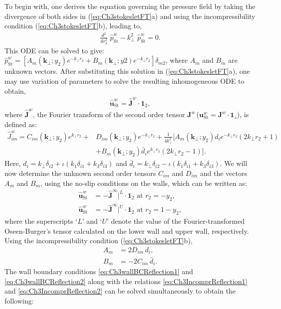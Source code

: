 \documentclass{jfm}
\begin{document}
To begin with, one derives the equation governing the pressure field by taking the divergence of both sides in (\ref{eq:Ch3stokesletFT}a) and using the incompressibility condition (\ref{eq:Ch3stokesletFT}b), leading to,
\begin{align}
	\frac{d^2}{d r_2^2}\,\,\hat{p}^{w}_\text{St}-k_\perp^2\,\, \hat{p}^{w}_\text{St}=0.
\end{align} \label{eq:Ch3PressureFT}
This ODE can be solved to give: $\hat{p}^w_\text{St}=[A_m(\bm{k}_\perp;y_2) e^{-k_\perp r_2}+B_m(\bm{k}_\perp;y2)e^{-k_\perp r_2}]\delta_{m2}$, where $A_m$ and $B_m$ are unknown vectors. After substituting this solution in (\ref{eq:Ch3stokesletFT}a), one may use variation of parameters \citep{arfkenweber} to solve the resulting inhomogeneous ODE to obtain,
\begin{align}
\hat{\bm{u}}^{w}_\text{St}=\hat{\bm{J}}^w\cdot\bm{1}_2,
\end{align}
where $\hat{\bm{J}}^w$, the Fourier transform of the second order tensor $\bm{J}^w$\,($\bm{u}^{w}_\text{St} = \bm{J}^w \cdot \bm{1}_s$), is defined as: 
\begin{align}
\hat{J}_{im}^w=C_{im}(\bm{k}_\perp;y_2)e^{k_\perp r_2}+&D_{im}(\bm{k}_\perp;y_2)e^{-k_\perp r_2}+\frac{1}{4k_\perp^2}\big[A_m(\bm{k}_\perp;y_2) d_i e^{-k_\perp r_2}(2k_\perp r_2+1)\nonumber\\
&+B_m(\bm{k}_\perp;y_2)\bar{d}_i e^{k_\perp r_2}(2k_\perp r_2-1)\big].
\label{eq:Ch3Jhatw}
\end{align}
Here, $d_i=k_\perp\delta_{i2}+\iota (k_1\delta_{i1}+k_3 \delta_{i3})$ and
$\bar{d}_i=k_\perp\delta_{i2}-\iota (k_1\delta_{i1}+k_3 \delta_{i3})$. We will now determine the unknown second order tensors $C_{im}$ and $D_{im}$ and the vectors $A_m$ and $B_m$, using the no-slip conditions on the walls, which can be written as:
\begin{align}
\hat{\bm{u}}^{w}_\text{St}& = -\hat{\bm{J}}^\infty|^L\cdot\bm{1}_2 \text{ at } r_2=-y_2,\label{eq:Ch3wallBCReflection1}\\
\hat{\bm{u}}^{w}_\text{St}& = -\hat{\bm{J}}^\infty|^U\cdot\bm{1}_2 \text{ at } r_2=1-y_2\label{eq:Ch3wallBCReflection2},
\end{align}
where the superscripts `$L$' and `$U$' denote the value of the Fourier-transformed Oseen-Burger's tensor calculated on the lower wall and upper wall, respectively. Using the incompressibility condition (\ref{eq:Ch3stokesletFT}b), 
\begin{align}
A_m&=2 D_{im}\,d_i, \label{eq:Ch3IncomprReflection1}\\
B_m&=-2 C_{im}\,\bar{d}_i. \label{eq:Ch3IncomprReflection2}
\end{align}
The wall boundary conditions \eqref{eq:Ch3wallBCReflection1} and \eqref{eq:Ch3wallBCReflection2} along with the relations \eqref{eq:Ch3IncomprReflection1} and \eqref{eq:Ch3IncomprReflection2} can be solved simultaneously to obtain the following:
\end{document}
